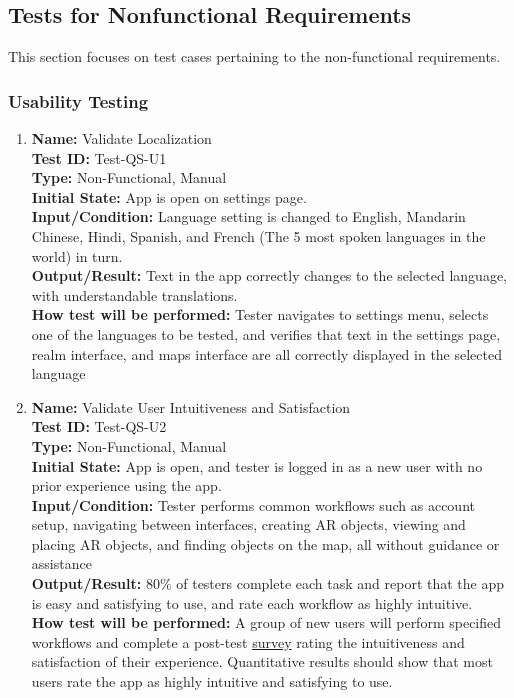 \documentclass[12pt, titlepage]{article}
\begin{document}
\subsection{Tests for Nonfunctional Requirements}
This section focuses on test cases pertaining to the non-functional requirements.

\subsubsection{Usability Testing}


\begin{enumerate}

    \item \textbf{Name:} Validate Localization \label{itm:Test-QS-U1} \\
    \textbf{Test ID:} Test-QS-U1 \\
    \textbf{Type:} Non-Functional, Manual \\
    \textbf{Initial State:} App is open on settings page. \\
    \textbf{Input/Condition:} Language setting is changed to English, Mandarin Chinese, Hindi, Spanish, and French (The 5 most spoken languages in the world) in turn.  \\
    \textbf{Output/Result:} Text in the app correctly changes to the selected language, with understandable translations. \\
    \textbf{How test will be performed:} Tester navigates to settings menu, selects one of the languages to be tested, and verifies that text in the settings page, realm interface, and maps interface are all correctly displayed in the selected language

    \item \textbf{Name:} Validate User Intuitiveness and Satisfaction \label{itm:Test-QS-U2} \\
    \textbf{Test ID:} Test-QS-U2 \\
    \textbf{Type:} Non-Functional, Manual \\
    \textbf{Initial State:} App is open, and tester is logged in as a new user with no prior experience using the app. \\
    \textbf{Input/Condition:} Tester performs common workflows such as account setup, navigating between interfaces, creating AR objects, viewing and placing AR objects, and finding objects on the map, all without guidance or assistance  \\
    \textbf{Output/Result:} 80\% of testers complete each task and report that the app is easy and satisfying to use, and rate each workflow as highly intuitive.\\
    \textbf{How test will be performed:} A group of new users will perform specified workflows and complete a post-test \hyperref[sub:usability_survey]{survey} rating the intuitiveness and satisfaction of their experience. Quantitative results should show that most users rate the app as highly intuitive and satisfying to use.

\end{enumerate}
\end{document}
